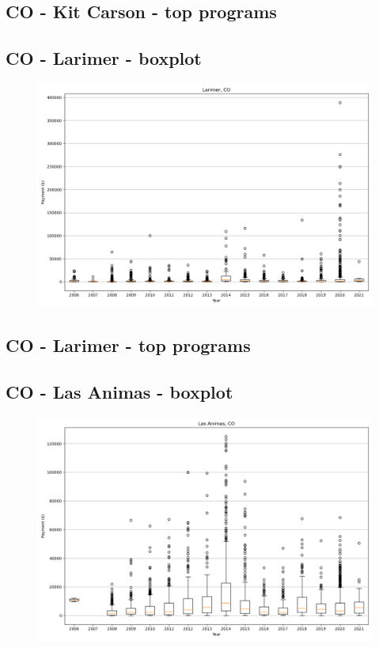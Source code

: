 \subsection*{CO - Kit Carson - top programs}

\newpage
\subsection*{CO - Larimer - boxplot}
\begin{figure}[h]
\centering
\includegraphics[width=7in]{../output/boxplots/counties/Larimer-CO_boxplot.png}
\end{figure}


\subsection*{CO - Larimer - top programs}

\newpage
\subsection*{CO - Las Animas - boxplot}
\begin{figure}[h]
\centering
\includegraphics[width=7in]{../output/boxplots/counties/Las Animas-CO_boxplot.png}
\end{figure}


